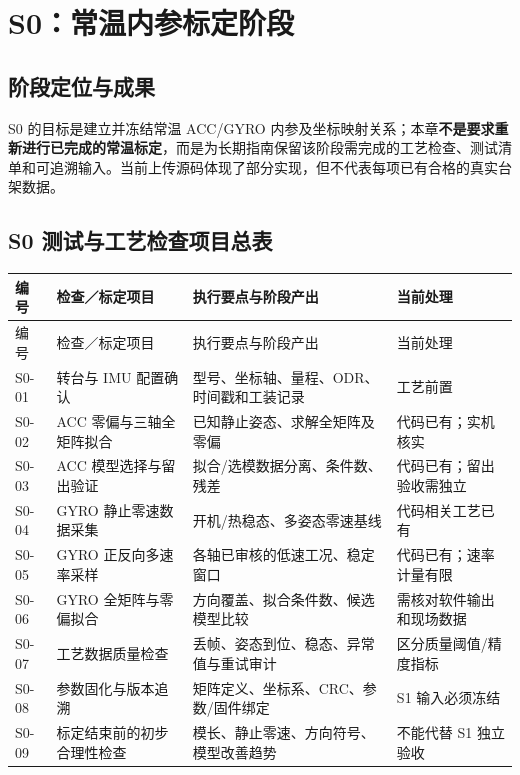 \chapter{S0：常温内参标定阶段}
\section{阶段定位与成果}
S0 的目标是建立并冻结常温 ACC/GYRO 内参及坐标映射关系；本章\textbf{不是要求重新进行已完成的常温标定}，而是为长期指南保留该阶段需完成的工艺检查、测试清单和可追溯输入。当前上传源码体现了部分实现，但不代表每项已有合格的真实台架数据。
\section{S0 测试与工艺检查项目总表}
\small
\begin{longtable}{C{17mm}p{48mm}p{50mm}p{28mm}}
\toprule 编号 & 检查／标定项目 & 执行要点与阶段产出 & 当前处理\\\midrule\endfirsthead
\toprule 编号 & 检查／标定项目 & 执行要点与阶段产出 & 当前处理\\\midrule\endhead
S0-01 & 转台与 IMU 配置确认 & 型号、坐标轴、量程、ODR、时间戳和工装记录 & 工艺前置\\
S0-02 & ACC 零偏与三轴全矩阵拟合 & 已知静止姿态、求解全矩阵及零偏 & 代码已有；实机核实\\
S0-03 & ACC 模型选择与留出验证 & 拟合/选模数据分离、条件数、残差 & 代码已有；留出验收需独立\\
S0-04 & GYRO 静止零速数据采集 & 开机/热稳态、多姿态零速基线 & 代码相关工艺已有\\
S0-05 & GYRO 正反向多速率采样 & 各轴已审核的低速工况、稳定窗口 & 代码已有；速率计量有限\\
S0-06 & GYRO 全矩阵与零偏拟合 & 方向覆盖、拟合条件数、候选模型比较 & 需核对软件输出和现场数据\\
S0-07 & 工艺数据质量检查 & 丢帧、姿态到位、稳态、异常值与重试审计 & 区分质量阈值/精度指标\\
S0-08 & 参数固化与版本追溯 & 矩阵定义、坐标系、CRC、参数/固件绑定 & S1 输入必须冻结\\
S0-09 & 标定结束前的初步合理性检查 & 模长、静止零速、方向符号、模型改善趋势 & 不能代替 S1 独立验收\\\bottomrule
\end{longtable}
\normalsize
